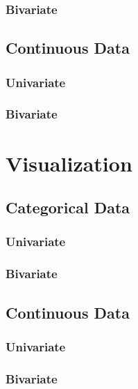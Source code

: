 \documentclass[12pt,a4paper]{report}
\begin{document}
\subsubsection{Bivariate}


\subsection{Continuous Data}

\subsubsection{Univariate}

\subsubsection{Bivariate}









\section{Visualization}

\subsection{Categorical Data}

\subsubsection{Univariate}

\subsubsection{Bivariate}


\subsection{Continuous Data}

\subsubsection{Univariate}


\subsubsection{Bivariate}
\end{document}
